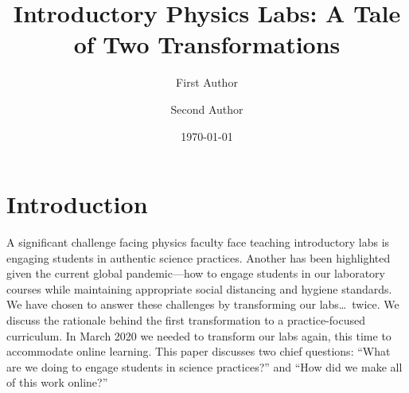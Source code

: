 \documentclass[aip, numerical, preprint]{revtex4-2}
\begin{document}
\title{Introductory Physics Labs: A Tale of Two Transformations}


\author{First Author} 

\author{Second Author} 

\date{\today}


\maketitle

\section{Introduction}
A significant challenge facing physics faculty face teaching introductory labs is engaging
students in authentic science practices.  Another has been highlighted given the current global
pandemic---how to engage students in our laboratory courses while maintaining appropriate
social distancing and hygiene standards. We have chosen to answer these challenges by
transforming our labs\ldots\ twice. We discuss the rationale behind the first transformation to
a practice-focused curriculum.  In March 2020 we needed to transform our labs again, this time
to accommodate online learning. This paper discusses two chief questions: ``What are we doing
to engage students in science practices?'' and ``How did we make all of this work online?''
\end{document}
